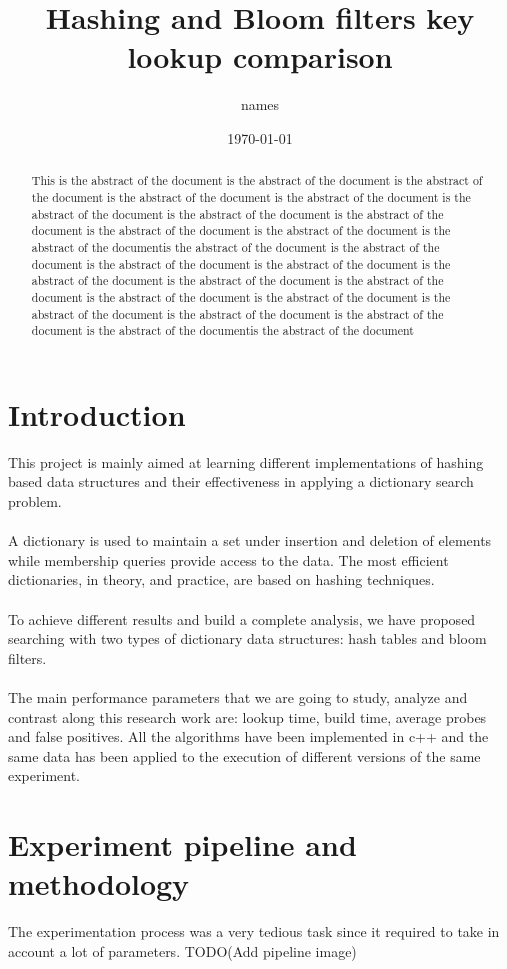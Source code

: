 \documentclass{article}
\title{Hashing and Bloom filters key lookup comparison}
\author{names}
\date{\today}
\begin{document}
    \maketitle
    \thispagestyle{empty}
    \begin{abstract}
	This is the abstract of the document is the abstract of the document is the abstract of the document is the abstract of the document is the abstract of the document
	is the abstract of the document is the abstract of the document is the abstract of the document is the abstract of the document is the abstract of the document
	 is the abstract of the documentis the abstract of the document is the abstract of the document is the abstract of the document is the abstract of the document
	 is the abstract of the document  is the abstract of the document is the abstract of the document is the abstract of the document is the abstract of the document
	 is the abstract of the document is the abstract of the document is the abstract of the document is the abstract of the documentis the abstract of the document
    \end{abstract}
	

    \section{Introduction}
        This project is mainly aimed at learning different implementations of hashing based data structures and their effectiveness in applying a dictionary search problem. \\\\
A dictionary is used to maintain a set under insertion and deletion of elements while membership queries provide access to the data. The most efficient dictionaries, in theory, and practice, are based on hashing techniques. \\\\
To achieve different results and build a complete analysis, we have proposed searching with two types of dictionary data structures: hash tables and bloom filters. \\\\
The main performance parameters that we are going to study, analyze and contrast along this research work are: lookup time, build time, average probes and false positives.
All the algorithms have been implemented in c++ and the same data has been applied to the execution of different versions of the same experiment. 

    \section{Experiment pipeline and methodology}
    	The experimentation process was a very tedious task since it required to take in account a lot of parameters. TODO(Add pipeline image)
\end{document}
